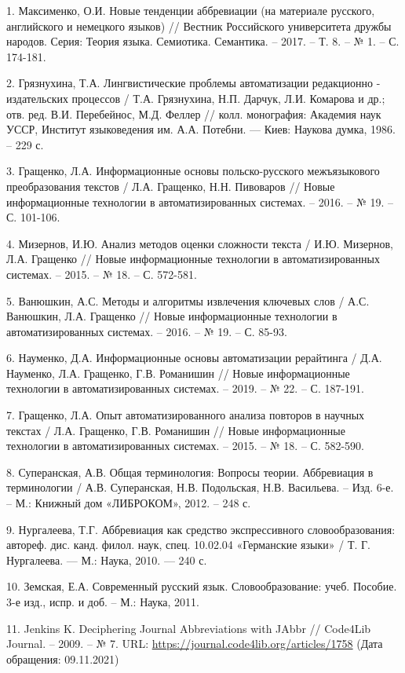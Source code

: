 \documentclass[fleqn, a4paper,12pt]{article}
\begin{document}
1. Максименко, О.И. Новые тенденции аббревиации (на материале русского, английского и немецкого языков) // Вестник Российского университета дружбы народов. Серия: Теория языка. Семиотика. Семантика. – 2017. – Т. 8. – № 1. – С. 174-181.

2. Грязнухина, Т.А. Лингвистические проблемы автоматизации редакционно - издательских процессов / Т.А. Грязнухина, Н.П. Дарчук, Л.И. Комарова и др.; отв. ред. В.И. Перебейнос, М.Д. Феллер // колл. монография: Академия наук УССР, Институт языковедения им. А.А. Потебни. — Киев: Наукова думка, 1986. – 229 с.

3. Гращенко, Л.А. Информационные основы польско-русского межъязыкового преобразования текстов / Л.А. Гращенко, Н.Н. Пивоваров // Новые информационные технологии в автоматизированных системах. – 2016. – № 19. – С. 101-106.

4. Мизернов, И.Ю. Анализ методов оценки сложности текста / И.Ю. Мизернов, Л.А. Гращенко // Новые информационные технологии в автоматизированных системах. – 2015. – № 18. – С. 572-581.

5. Ванюшкин, А.С. Методы и алгоритмы извлечения ключевых слов / А.С. Ванюшкин, Л.А. Гращенко // Новые информационные технологии в автоматизированных системах. – 2016. – № 19. – С. 85-93.

6. Науменко, Д.А. Информационные основы автоматизации рерайтинга / Д.А. Науменко, Л.А. Гращенко, Г.В. Романишин // Новые информационные технологии в автоматизированных системах. – 2019. – № 22. – С. 187-191.

7. Гращенко, Л.А. Опыт автоматизированного анализа повторов в научных текстах / Л.А. Гращенко, Г.В. Романишин // Новые информационные технологии в автоматизированных системах. – 2015. – № 18. – С. 582-590.

8. Суперанская, А.В. Общая терминология: Вопросы теории. Аббревиация в терминологии / А.В. Суперанская, Н.В. Подольская, Н.В. Васильева. – Изд. 6-е. – М.: Книжный дом «ЛИБРОКОМ», 2012. – 248 с.

9. Нургалеева, Т.Г. Аббревиация как средство экспрессивного словообразования: автореф. дис. канд. филол. наук, спец. 10.02.04 «Германские языки» / Т. Г. Нургалеева. — М.: Наука, 2010. — 240 с.

10. Земская, Е.А. Современный русский язык. Словообразование: учеб. Пособие. 3-е изд., испр. и доб. – М.: Наука, 2011.

11. Jenkins K. Deciphering Journal Abbreviations with JAbbr // Code4Lib Journal. – 2009. – № 7. URL: \url{https://journal.code4lib.org/articles/1758} (Дата обращения: 09.11.2021)
\end{document}
